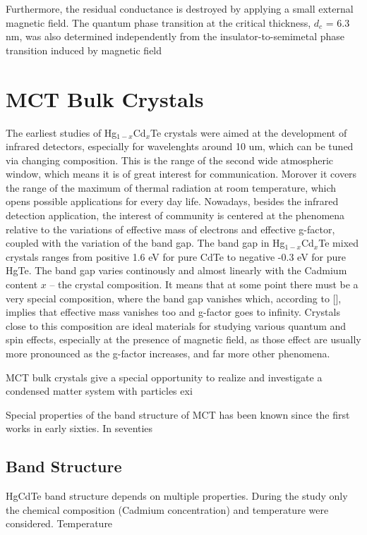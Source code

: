 \documentclass[titlepage,a4paper]{book}
\newcommand{\wciecie}{\quad\phantom{v}}
\begin{document}
Furthermore, the residual conductance is destroyed by applying a small external magnetic field. The quantum phase transition at the critical thickness, $d_c$ = 6.3 nm, was also determined independently from the insulator-to-semimetal phase transition induced by magnetic field

\section{MCT Bulk Crystals}
The earliest studies of Hg$_{1-x}$Cd$_x$Te crystals were aimed at the development of infrared detectors, especially for wavelenghts around 10 um, which can be tuned via changing composition. This is the range of the second wide atmospheric window, which means it is of great interest for communication. Morover it covers the range of the maximum of thermal radiation at room temperature, which opens possible applications for every day life. Nowadays, besides the infrared detection application, the interest of community is centered at the phenomena relative to the variations of effective mass of electrons and effective g-factor, coupled with the variation of the band gap. The band gap in Hg$_{1-x}$Cd$_x$Te mixed crystals ranges from positive 1.6 eV for pure CdTe to negative -0.3 eV for pure HgTe. The band gap varies continously and almost linearly with the Cadmium content $x$ -- the crystal composition. It means that at some point there must be a very special composition, where the band gap vanishes which, according to [], implies that effective mass vanishes too and g-factor goes to infinity. Crystals close to this composition are ideal materials for studying various quantum and spin effects, especially at the presence of magnetic field, as those effect are usually more pronounced as the g-factor increases, and far more other phenomena.

MCT bulk crystals give a special opportunity to realize and investigate a condensed matter system with particles exi

Special properties of the band structure of MCT has been known since the first works in early sixties. In seventies \cite{Zawadzki_MCT}



\subsection{Band Structure}
\wciecie
HgCdTe band structure depends on multiple properties. During the study only the chemical composition (Cadmium concentration) and temperature were considered. Temperature
\end{document}
